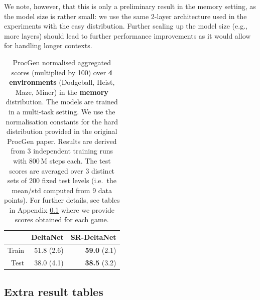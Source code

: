 \documentclass[nohyperref]{article}
\theoremstyle{plain}
\theoremstyle{definition}
\theoremstyle{remark}
\begin{document}
We note, however, that this is only a preliminary result in the memory setting, as the model size is rather small: we use the same 2-layer architecture used in the experiments with the easy distribution.
Further scaling up the model size (e.g., more layers) should lead to further performance improvements
as it would allow for handling longer contexts.

\begin{table}[t]
\caption{ProcGen normalised aggregated scores (multiplied by 100) over \textbf{4 environments} (Dodgeball, Heist, Maze, Miner) in the \textbf{memory} distribution.
The models are trained in a multi-task setting.
We use the normalisation constants for the hard distribution provided in the original ProcGen paper.
Results are derived from 3 independent training runs with 800\,M steps each.
The test scores are averaged over 3 distinct sets of 200 fixed test levels (i.e.~the mean/std computed from 9 data points).
For further details, see tables in Appendix \ref{app:tables} where we provide scores obtained for each game.
}
\label{tab:norm_mem_multi}
\begin{center}
\begin{tabular}{rrr}
\toprule
  & \multicolumn{1}{c}{DeltaNet} & \multicolumn{1}{c}{SR-DeltaNet}  \\ \midrule 
Train  & 51.8 (2.6) & \textbf{59.0} (2.1) \\  
Test   & 38.0 (4.1) & \textbf{38.5} (3.2) \\
\bottomrule
\end{tabular}
\end{center}
\end{table}

\subsection{Extra result tables}
\label{app:tables}
\end{document}
